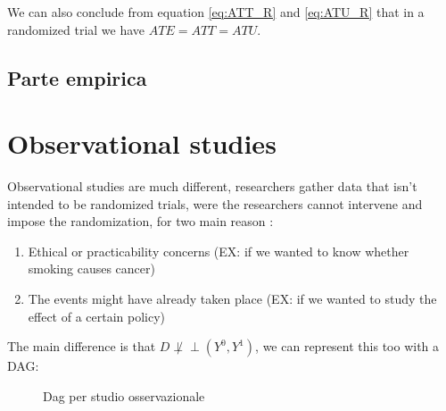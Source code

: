 We can also conclude from equation \ref{eq:ATT_R} and \ref{eq:ATU_R} that in a randomized trial we have $ATE = ATT = ATU$.
\subsection{Parte empirica}

\section{Observational studies} %
Observational studies are much different, researchers gather data that isn't intended to be randomized trials, were the researchers cannot intervene and impose the randomization, for two main reason :
\begin{enumerate}
\item Ethical or practicability concerns  (EX: if we wanted to know whether smoking causes cancer)
\item The events might have already taken place  (EX: if we wanted to study the effect of a certain policy)
\end{enumerate}

The main difference is that $D \not \perp\!\!\!\perp (Y^{0},Y^{1})$, we can represent this too with a DAG:
\begin{figure}[!h]
\centering
\caption{Dag per studio osservazionale}
\label{fig:dag_OBS}
\end{figure}
